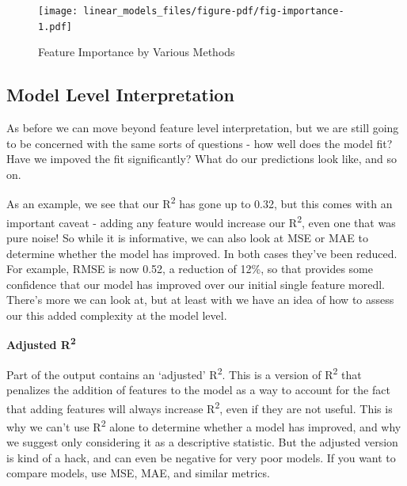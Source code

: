 \documentclass[
  letterpaper,
]{krantz}
\begin{document}
\begin{figure}

{\centering \texttt{[image: linear\_models\_files/figure-pdf/fig-importance-1.pdf]}

}

\caption{\label{fig-importance}Feature Importance by Various Methods}

\end{figure}

\subsection{Model Level Interpretation}\label{sec-lm-model-level}

As before we can move beyond feature level interpretation, but we are
still going to be concerned with the same sorts of questions - how well
does the model fit? Have we impoved the fit significantly? What do our
predictions look like, and so on.

As an example, we see that our R\textsuperscript{2} has gone up to 0.32,
but this comes with an important caveat - adding any feature would
increase our R\textsuperscript{2}, even one that was pure noise! So
while it is informative, we can also look at MSE or MAE to determine
whether the model has improved. In both cases they've been reduced. For
example, RMSE is now 0.52, a reduction of 12\%, so that provides some
confidence that our model has improved over our initial single feature
moredl. There's more we can look at, but at least with we have an idea
of how to assess our this added complexity at the model level.

\begin{tcolorbox}[enhanced jigsaw, toprule=.15mm, arc=.35mm, rightrule=.15mm, bottomrule=.15mm, leftrule=.75mm, breakable, colframe=quarto-callout-note-color-frame, colback=white, left=2mm, opacityback=0]
\begin{minipage}[t]{5.5mm}
\textcolor{quarto-callout-note-color}{\faInfo}
\end{minipage}%
\begin{minipage}[t]{\textwidth - 5.5mm}

\textbf{Adjusted R\textsuperscript{2}}\vspace{2mm}

Part of the output contains an `adjusted' R\textsuperscript{2}. This is
a version of R\textsuperscript{2} that penalizes the addition of
features to the model as a way to account for the fact that adding
features will always increase R\textsuperscript{2}, even if they are not
useful. This is why we can't use R\textsuperscript{2} alone to determine
whether a model has improved, and why we suggest only considering it as
a descriptive statistic. But the adjusted version is kind of a hack, and
can even be negative for very poor models. If you want to compare
models, use MSE, MAE, and similar metrics.

\end{minipage}%
\end{tcolorbox}
\end{document}
